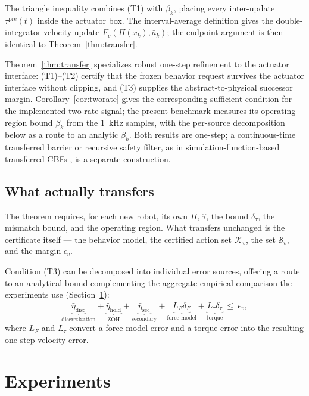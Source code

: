 \documentclass[journal]{IEEEtran}
\begin{document}
\begin{IEEEproof}
The triangle inequality combines (T1) with $\beta_k$, placing every inter-update $\tau^{\mathrm{pre}}(t)$ inside the actuator box. The interval-average definition gives the double-integrator velocity update $F_v(\Pi(x_k),\bar a_k)$; the endpoint argument is then identical to Theorem~\ref{thm:transfer}.
\end{IEEEproof}

Theorem~\ref{thm:transfer} specializes robust one-step refinement to the actuator interface: (T1)--(T2) certify that the frozen behavior request survives the actuator interface without clipping, and (T3) supplies the abstract-to-physical successor margin. Corollary~\ref{cor:tworate} gives the corresponding sufficient condition for the implemented two-rate signal; the present benchmark measures its operating-region bound $\beta_k$ from the 1~kHz samples, with the per-source decomposition below as a route to an analytic $\beta_k$. Both results are one-step; a continuous-time transferred barrier or recursive safety filter, as in simulation-function-based transferred CBFs \cite{r19}, is a separate construction.

\subsection{What actually transfers}

The theorem requires, for each new robot, its own $\Pi$, $\hat\tau$, the bound $\bar\delta_\tau$, the mismatch bound, and the operating region. What transfers unchanged is the certificate itself --- the behavior model, the certified action set $\mathcal K_v$, the set $\mathcal S_v$, and the margin $\epsilon_v$.

Condition (T3) can be decomposed into individual error sources, offering a route to an analytical bound complementing the aggregate empirical comparison the experiments use (Section~\ref{sec:experiments}):
\[
\underbrace{\bar\eta_{\mathrm{disc}}}_{\text{discretization}}
+\underbrace{\bar\eta_{\mathrm{hold}}}_{\text{ZOH}}
+\underbrace{\bar\eta_{\mathrm{sec}}}_{\text{secondary}}
+\underbrace{L_F\bar\delta_F}_{\text{force-model}}
+\underbrace{L_\tau\bar\delta_\tau}_{\text{torque}}
\ \le\ \epsilon_v ,
\]
where $L_F$ and $L_\tau$ convert a force-model error and a torque error into the resulting one-step velocity error.

\section{Experiments}
\label{sec:experiments}
\end{document}
